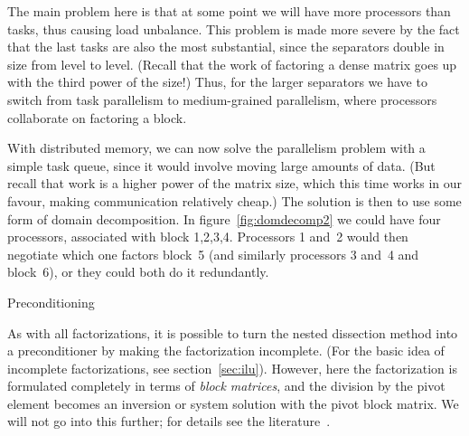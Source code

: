 The main problem here is that at some point we will have more
processors than tasks, thus causing load unbalance. This problem is
made more severe by the fact that the last tasks are also the most
substantial, since the separators double in size from level to
level. (Recall that the work of factoring a dense matrix goes up with the
third power of the size!) Thus, for the larger separators we have to
switch from task parallelism to medium-grained parallelism, where
processors collaborate on factoring a block.

With distributed memory, we can now solve the parallelism problem with
a simple task queue, since it would involve moving large amounts of
data. (But recall that work is a higher power of the matrix size,
which this time works in our favour, making communication relatively
cheap.) The solution is then to use some form of domain
decomposition. In figure~\ref{fig:domdecomp2} we could have four
processors, associated with block 1,2,3,4. Processors 1 and~2 would
then negotiate which one factors block~5 (and similarly processors 3
and~4 and block~6), or they could both do it redundantly.

 {Preconditioning}

As with all factorizations, it is possible to turn the nested
dissection method into a preconditioner by making the factorization
incomplete. (For the basic idea of incomplete factorizations, see
section~\ref{sec:ilu}). However, here the factorization is formulated
completely in terms of \emph{block matrices}, and
the division by the pivot element becomes an inversion or system
solution with the pivot block matrix. We will not go into this
further; for details see the
literature~\cite{AxPo:dd2,Eij:general,Me:dd}.

